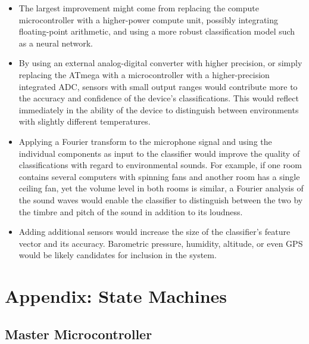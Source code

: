 \documentclass{article}
\begin{document}
\begin{itemize}

  \item The largest improvement might come from replacing the compute
    microcontroller with a higher-power compute unit, possibly
    integrating floating-point arithmetic, and using a more robust
    classification model such as a neural network.

  \item By using an external analog-digital converter with higher
    precision, or simply replacing the ATmega with a microcontroller
    with a higher-precision integrated ADC, sensors with small output
    ranges would contribute more to the accuracy and confidence of the
    device's classifications.  This would reflect immediately in the
    ability of the device to distinguish between environments with
    slightly different temperatures.

  \item Applying a Fourier transform to the microphone signal and using
    the individual components as input to the classifier would improve
    the quality of classifications with regard to environmental sounds.
    For example, if one room contains several computers with spinning
    fans and another room has a single ceiling fan, yet the volume level
    in both rooms is similar, a Fourier analysis of the sound waves
    would enable the classifier to distinguish between the two by the
    timbre and pitch of the sound in addition to its loudness.

  \item Adding additional sensors would increase the size of the
    classifier's feature vector and its accuracy.  Barometric pressure,
    humidity, altitude, or even GPS would be likely candidates for
    inclusion in the system.

\end{itemize}

\appendix

\section{Appendix: State Machines}
\label{app.sm}

\togglefalse{TASKSPECONLY}

\subsection{Master Microcontroller}
\label{app.sm.master}
\end{document}
